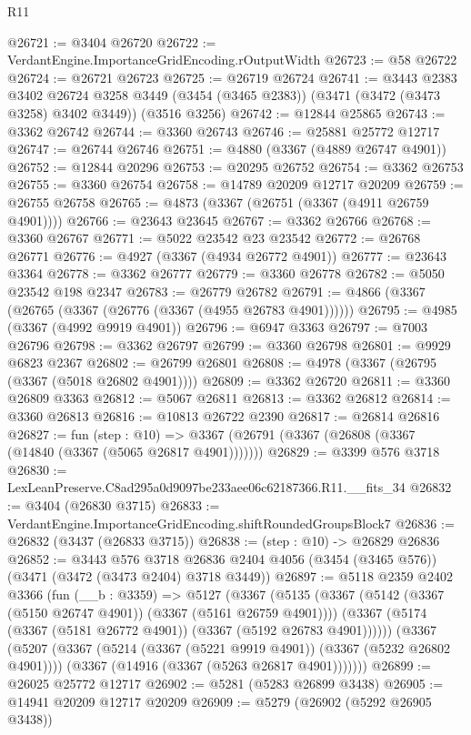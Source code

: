 \begin{lexlean}{R11}
\begin{coremodule}
@26721 := @3404 @26720
@26722 := VerdantEngine.ImportanceGridEncoding.rOutputWidth
@26723 := @58 @26722
@26724 := @26721 @26723
@26725 := @26719 @26724
@26741 := @3443
    @2383
    @3402
    @26724
    @3258
    @3449
    (@3454 (@3465 @2383))
    (@3471 (@3472 (@3473 @3258) @3402 @3449))
    (@3516 @3256)
@26742 := @12844 @25865
@26743 := @3362 @26742
@26744 := @3360 @26743
@26746 := @25881 @25772 @12717
@26747 := @26744 @26746
@26751 := @4880 (@3367 (@4889 @26747 @4901))
@26752 := @12844 @20296
@26753 := @20295 @26752
@26754 := @3362 @26753
@26755 := @3360 @26754
@26758 := @14789 @20209 @12717 @20209
@26759 := @26755 @26758
@26765 := @4873 (@3367 (@26751 (@3367 (@4911 @26759 @4901))))
@26766 := @23643 @23645
@26767 := @3362 @26766
@26768 := @3360 @26767
@26771 := @5022 @23542 @23 @23542
@26772 := @26768 @26771
@26776 := @4927 (@3367 (@4934 @26772 @4901))
@26777 := @23643 @3364
@26778 := @3362 @26777
@26779 := @3360 @26778
@26782 := @5050 @23542 @198 @2347
@26783 := @26779 @26782
@26791 := @4866 (@3367 (@26765 (@3367 (@26776 (@3367 (@4955 @26783 @4901))))))
@26795 := @4985 (@3367 (@4992 @9919 @4901))
@26796 := @6947 @3363
@26797 := @7003 @26796
@26798 := @3362 @26797
@26799 := @3360 @26798
@26801 := @9929 @6823 @2367
@26802 := @26799 @26801
@26808 := @4978 (@3367 (@26795 (@3367 (@5018 @26802 @4901))))
@26809 := @3362 @26720
@26811 := @3360 @26809 @3363
@26812 := @5067 @26811
@26813 := @3362 @26812
@26814 := @3360 @26813
@26816 := @10813 @26722 @2390
@26817 := @26814 @26816
@26827 := fun (step : @10) =>
  @3367 (@26791 (@3367 (@26808 (@3367 (@14840 (@3367 (@5065 @26817 @4901)))))))
@26829 := @3399 @576 @3718
@26830 := LexLeanPreserve.C8ad295a0d9097be233aee06c62187366.R11.__fits_34
@26832 := @3404 (@26830 @3715)
@26833 := VerdantEngine.ImportanceGridEncoding.shiftRoundedGroupsBlock7
@26836 := @26832 (@3437 (@26833 @3715))
@26838 := (step : @10) -> @26829 @26836
@26852 := @3443
    @576
    @3718
    @26836
    @2404
    @4056
    (@3454 (@3465 @576))
    (@3471 (@3472 (@3473 @2404) @3718 @3449))
@26897 := @5118
    @2359
    @2402
    @3366
    (fun (__b : @3359) =>
    @5127
      (@3367
        (@5135
          (@3367 (@5142 (@3367 (@5150 @26747 @4901)) (@3367 (@5161 @26759 @4901))))
          (@3367 (@5174 (@3367 (@5181 @26772 @4901)) (@3367 (@5192 @26783 @4901))))))
      (@3367
        (@5207
          (@3367 (@5214 (@3367 (@5221 @9919 @4901)) (@3367 (@5232 @26802 @4901))))
          (@3367 (@14916 (@3367 (@5263 @26817 @4901)))))))
@26899 := @26025 @25772 @12717
@26902 := @5281 (@5283 @26899 @3438)
@26905 := @14941 @20209 @12717 @20209
@26909 := @5279 (@26902 (@5292 @26905 @3438))

\end{coremodule}
\end{lexlean}
